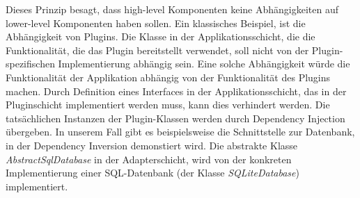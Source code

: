 Dieses Prinzip besagt, dass high-level Komponenten keine Abhängigkeiten auf lower-level Komponenten haben sollen. Ein klassisches Beispiel, ist die Abhängigkeit von Plugins. Die Klasse in der Applikationsschicht, die die Funktionalität, die das Plugin bereitstellt verwendet, soll nicht von der Plugin-spezifischen Implementierung abhängig sein. Eine solche Abhängigkeit würde die Funktionalität der Applikation abhängig von der Funktionalität des Plugins machen. Durch Definition eines Interfaces in der Applikationsschicht, das in der Pluginschicht implementiert werden muss, kann dies verhindert werden. Die tatsächlichen Instanzen der Plugin-Klassen werden durch Dependency Injection übergeben. In unserem Fall gibt es beispielsweise die Schnittstelle zur Datenbank, in der Dependency Inversion demonstiert wird. Die abstrakte Klasse \textit{AbstractSqlDatabase} in der Adapterschicht, wird von der konkreten Implementierung einer SQL-Datenbank (der Klasse \textit{SQLiteDatabase}) implementiert.
